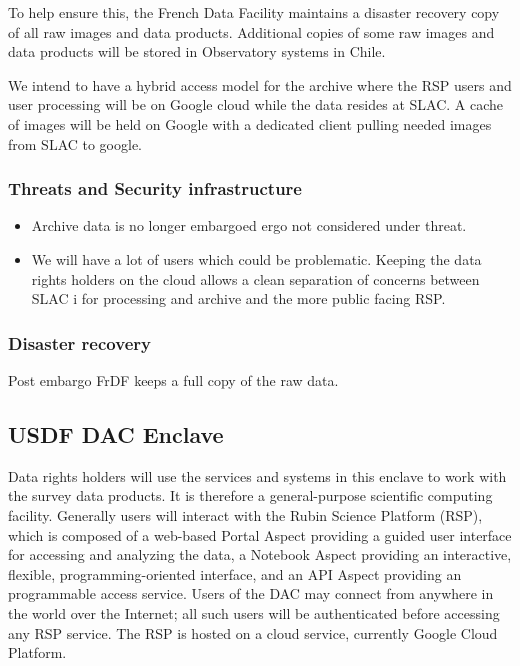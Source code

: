 To help ensure this, the French Data Facility maintains a disaster recovery copy of all raw images and data products. Additional copies of some raw images and data products will be stored in Observatory systems in Chile.

We intend to have a hybrid access model for the archive where  the \gls{RSP} users and user processing will be on Google cloud while the data resides at SLAC. A cache of images will be held on Google with a dedicated client pulling needed images from SLAC to google.


\subsubsection{ Threats and Security infrastructure}

\begin{itemize}
\item Archive data is no longer embargoed ergo not considered under threat.
\item We will have a lot of users which could be problematic. Keeping the data rights holders on the cloud allows a clean separation of concerns between SLAC i for processing and archive and the more public facing \gls{RSP}.
\end{itemize}
\subsubsection{Disaster recovery}
Post embargo FrDF keeps a full copy of the raw data.



\subsection{ USDF \gls{DAC} Enclave}
Data rights holders will use the services and systems in this enclave to work with the survey data products.
It is therefore a general-purpose scientific computing facility. Generally users will interact with the Rubin Science Platform (\gls{RSP}), which is composed of a web-based Portal Aspect providing a guided user interface for accessing and analyzing the data, a Notebook Aspect providing an interactive, flexible, programming-oriented interface, and an API Aspect providing an programmable access service.
Users of the DAC may connect from anywhere in the world over the Internet; all such users will be authenticated before accessing any \gls{RSP} service.
The \gls{RSP} is hosted on a cloud service, currently  Google Cloud Platform.

